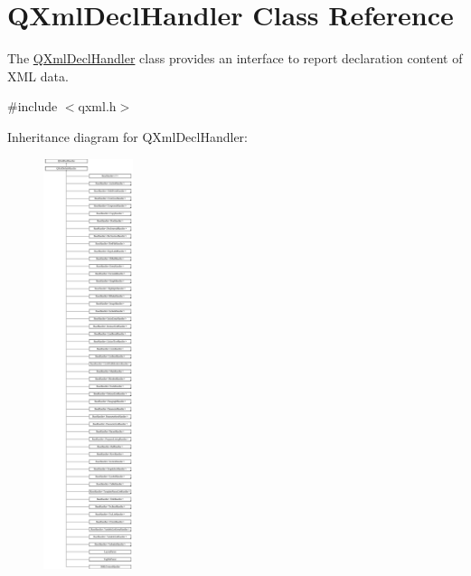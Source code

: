 \hypertarget{class_q_xml_decl_handler}{}\section{Q\+Xml\+Decl\+Handler Class Reference}
\label{class_q_xml_decl_handler}


The \mbox{\hyperlink{class_q_xml_decl_handler}{Q\+Xml\+Decl\+Handler}} class provides an interface to report declaration content of X\+ML data.  




{\ttfamily \#include $<$qxml.\+h$>$}

Inheritance diagram for Q\+Xml\+Decl\+Handler\+:\begin{figure}[H]
\begin{center}
\leavevmode
\includegraphics[height=12.000000cm]{class_q_xml_decl_handler}
\end{center}
\end{figure}
